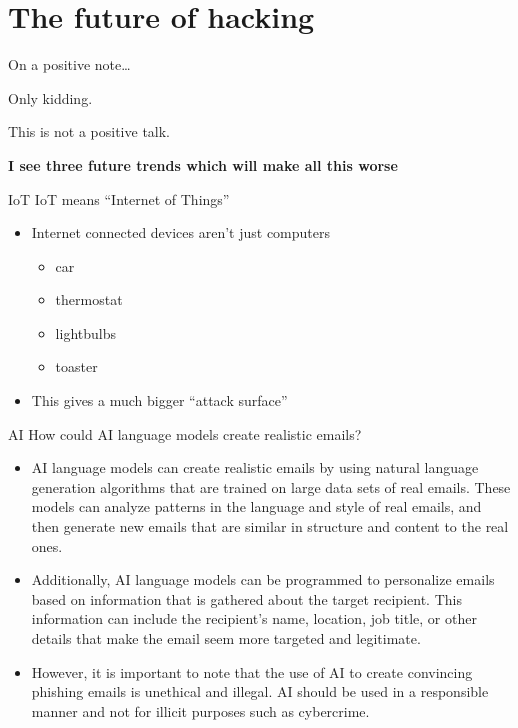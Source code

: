 \documentclass[xcolor=table]{beamer}
\begin{document}
\section{The future of hacking}
\begin{frame}{On a positive note\ldots}

Only kidding. 


	\vspace{0.5em}

	This is not a positive talk.

	\vspace{0.5em}

	\textbf{I see three future trends which will make all this worse}

\end{frame}
\begin{frame}{IoT}
	IoT means ``Internet of Things''
	\begin{itemize}
		\item Internet connected devices aren't just computers
			\begin{itemize}
				\item car
				\item thermostat
				\item lightbulbs
				\item toaster
			\end{itemize}
		\item This gives a much bigger ``attack surface''
	\end{itemize}

\end{frame}
\begin{frame}{AI}
	How could AI language models create realistic emails?
	\begin{itemize}
		\item AI language models can create realistic emails by using natural language generation algorithms that are trained on large data sets of real emails. These models can analyze patterns in the language and style of real emails, and then generate new emails that are similar in structure and content to the real ones.

		\item Additionally, AI language models can be programmed to personalize emails based on information that is gathered about the target recipient. This information can include the recipient's name, location, job title, or other details that make the email seem more targeted and legitimate.

		\item However, it is important to note that the use of AI to create convincing phishing emails is unethical and illegal. AI should be used in a responsible manner and not for illicit purposes such as cybercrime.
	\end{itemize}
\end{frame}
\end{document}
